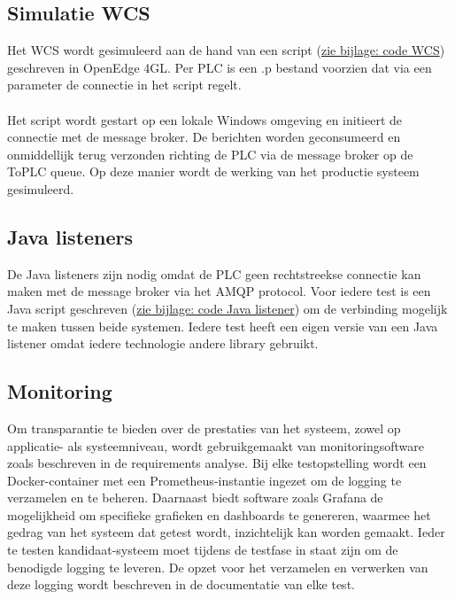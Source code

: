 \subsection{Simulatie WCS}
Het WCS wordt gesimuleerd aan de hand van een script (\hyperref[sec:code_wcs]{zie bijlage: code WCS}) geschreven in OpenEdge 4GL.
Per PLC is een .p bestand voorzien dat via een parameter de connectie in het script regelt.
\\\\
Het script wordt gestart op een lokale Windows omgeving en initieert de connectie met de message broker.
De berichten worden geconsumeerd en onmiddellijk terug verzonden richting de PLC via de message broker op de ToPLC queue.
Op deze manier wordt de werking van het productie systeem gesimuleerd.

\subsection{Java listeners}
De Java listeners zijn nodig omdat de PLC geen rechtstreekse connectie kan maken met de message broker via het AMQP protocol.
Voor iedere test is een Java script geschreven (\hyperref[sec:code_java_listener]{zie bijlage: code Java listener}) om de verbinding mogelijk te maken tussen beide systemen.
Iedere test heeft een eigen versie van een Java listener omdat iedere technologie andere library gebruikt.

\subsection{Monitoring}
Om transparantie te bieden over de prestaties van het systeem, zowel op applicatie- als systeemniveau, 
wordt gebruikgemaakt van monitoringsoftware zoals beschreven in de requirements analyse.
Bij elke testopstelling wordt een Docker-container met een Prometheus-instantie ingezet om de logging te verzamelen en te beheren.
Daarnaast biedt software zoals Grafana de mogelijkheid om specifieke grafieken en dashboards te genereren, 
waarmee het gedrag van het systeem dat getest wordt, inzichtelijk kan worden gemaakt.
Ieder te testen kandidaat-systeem moet tijdens de testfase in staat zijn om de benodigde logging te leveren. 
De opzet voor het verzamelen en verwerken van deze logging wordt beschreven in de documentatie van elke test.
\newpage

